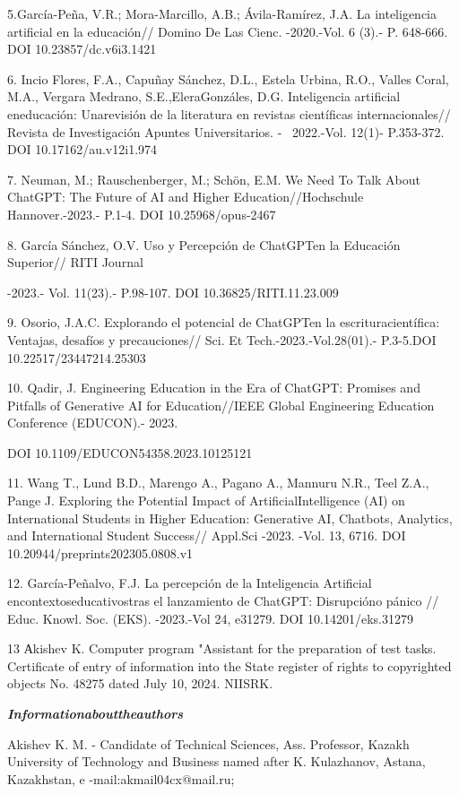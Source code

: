 5.García-Peña, V.R.; Mora-Marcillo, A.B.; Ávila-Ramírez, J.A. La
inteligencia artificial en la educación// Domino De Las Cienc.
-2020.-Vol. 6 (3).- P. 648-666. DOI 10.23857/dc.v6i3.1421

6. Incio Flores, F.A., Capuñay Sánchez, D.L., Estela Urbina, R.O.,
Valles Coral, M.A., Vergara Medrano, S.E.,EleraGonzáles, D.G.
Inteligencia artificial eneducación: Unarevisión de la literatura en
revistas científicas internacionales// Revista de Investigación Apuntes
Universitarios. - ~2022.-Vol. 12(1)- P.353-372. DOI
10.17162/au.v12i1.974

7. Neuman, M.; Rauschenberger, M.; Schön, E.M. We Need To Talk About
ChatGPT: The Future of AI and Higher Education//Hochschule
Hannover.-2023.- P.1-4. DOI 10.25968/opus-2467

8. García Sánchez, O.V. Uso y Percepción de ChatGPTen la Educación
Superior// RITI Journal

-2023.- Vol. 11(23).- P.98-107. DOI 10.36825/RITI.11.23.009

9. Osorio, J.A.C. Explorando el potencial de ChatGPTen la
escrituracientífica: Ventajas, desafíos y precauciones// Sci. Et
Tech.-2023.-Vol.28(01).- P.3-5.DOI 10.22517/23447214.25303

10. Qadir, J. Engineering Education in the Era of ChatGPT: Promises and
Pitfalls of Generative AI for Education//IEEE Global Engineering
Education Conference (EDUCON).- 2023.

DOI 10.1109/EDUCON54358.2023.10125121

11. Wang T., Lund B.D., Marengo A., Pagano A., Mannuru N.R., Teel Z.A.,
Pange J. Exploring the Potential Impact of ArtificialIntelligence (AI)
on International Students in Higher Education: Generative AI, Chatbots,
Analytics, and International Student Success// Appl.Sci -2023. -Vol. 13,
6716. DOI 10.20944/preprints202305.0808.v1

12. García-Peñalvo, F.J. La percepción de la Inteligencia Artificial
encontextoseducativostras el lanzamiento de ChatGPT: Disrupcióno pánico
// Educ. Knowl. Soc. (EKS). -2023.-Vol 24, e31279. DOI
10.14201/eks.31279

13 Аkishev K. Computer program "Assistant for the preparation of test
tasks. Certificate of entry of information into the State register of
rights to copyrighted objects No. 48275 dated July 10, 2024. NIISRK.

\emph{{\bfseries Informationabouttheauthors}}

Akishev K. M. - Candidate of Technical Sciences, Ass. Professor, Kazakh
University of Technology and Business named after K. Kulazhanov, Astana,
Kazakhstan, e -mail:akmail04cx@mail.ru;

